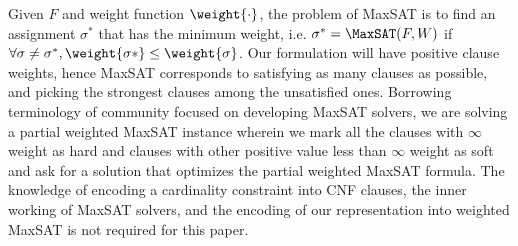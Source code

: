 Given $F$ and weight function $\weight{\cdot}$, the problem of {MaxSAT} is to find an assignment $\sigma^*$ that has the minimum weight, i.e.  $\sigma^* = \MaxSAT(F,W)$ if $\forall \sigma \neq \sigma^*, \weight{\sigma*} \leq \weight{\sigma}$. Our formulation will have positive clause weights, hence MaxSAT corresponds to satisfying as many clauses as possible, and picking the strongest clauses among the unsatisfied ones. 
Borrowing terminology of community focused on developing {MaxSAT} solvers, we are solving a partial weighted {MaxSAT} instance wherein we mark all the clauses with $\infty$ weight as hard and clauses with other positive value less than $ \infty $ weight as soft  and ask for a solution that optimizes the partial weighted {MaxSAT} formula.  The knowledge of encoding a  cardinality constraint into CNF clauses, the  inner working of {MaxSAT} solvers,  and  the encoding of our representation into weighted {MaxSAT} is not required for this paper.   


